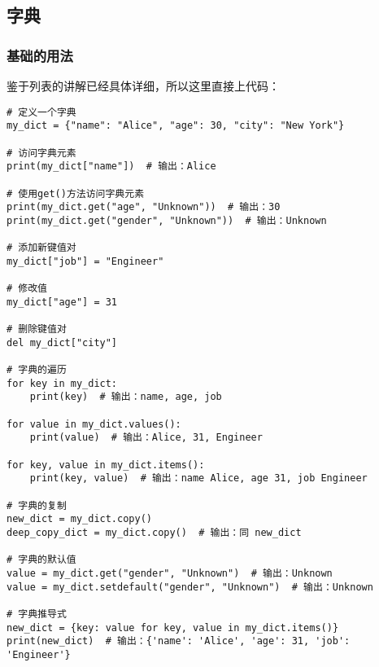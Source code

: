 \documentclass{article}
\begin{document}
\subsection{字典}

\subsubsection{基础的用法}
鉴于列表的讲解已经具体详细，所以这里直接上代码：
\begin{lstlisting}[caption={示例Python代码}]
# 定义一个字典
my_dict = {"name": "Alice", "age": 30, "city": "New York"}

# 访问字典元素
print(my_dict["name"])  # 输出：Alice

# 使用get()方法访问字典元素
print(my_dict.get("age", "Unknown"))  # 输出：30
print(my_dict.get("gender", "Unknown"))  # 输出：Unknown

# 添加新键值对
my_dict["job"] = "Engineer"

# 修改值
my_dict["age"] = 31

# 删除键值对
del my_dict["city"]

# 字典的遍历
for key in my_dict:
    print(key)  # 输出：name, age, job

for value in my_dict.values():
    print(value)  # 输出：Alice, 31, Engineer

for key, value in my_dict.items():
    print(key, value)  # 输出：name Alice, age 31, job Engineer

# 字典的复制
new_dict = my_dict.copy()
deep_copy_dict = my_dict.copy()  # 输出：同 new_dict

# 字典的默认值
value = my_dict.get("gender", "Unknown")  # 输出：Unknown
value = my_dict.setdefault("gender", "Unknown")  # 输出：Unknown

# 字典推导式
new_dict = {key: value for key, value in my_dict.items()}
print(new_dict)  # 输出：{'name': 'Alice', 'age': 31, 'job': 'Engineer'}


\end{lstlisting}
\end{document}
